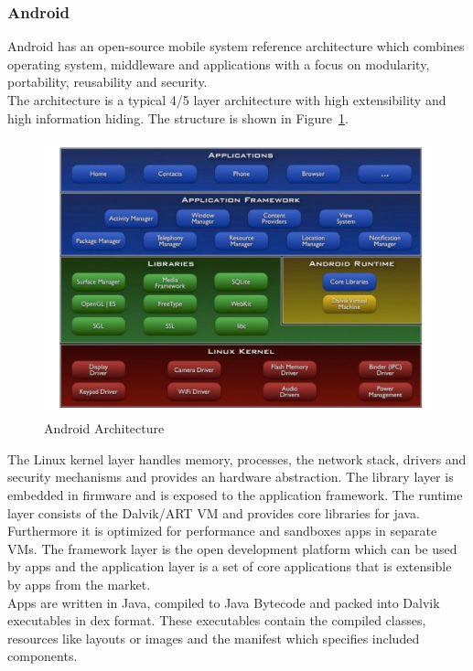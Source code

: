 \subsubsection{Android}
Android has an open-source mobile system reference architecture which combines operating system, middleware and applications with a focus on modularity, portability, reusability and security.\\
The architecture is a typical 4/5 layer architecture with high extensibility and high information hiding.
The structure is shown in Figure~\ref{fig:android}.
\begin{figure}[h]
  \centering
  \includegraphics[width=.8\textwidth]{images/android.png}
  \caption{Android Architecture}\label{fig:android}
\end{figure}
The Linux kernel layer handles memory, processes, the network stack, drivers and security mechanisms and provides an hardware abstraction.
The library layer is embedded in firmware and is exposed to the application framework.
The runtime layer consists of the Dalvik/ART VM and provides core libraries for java.
Furthermore it is optimized for performance and sandboxes apps in separate VMs.
The framework layer is the open development platform which can be used by apps and the application layer is a set of core applications that is extensible by apps from the market.\\

Apps are written in Java, compiled to Java Bytecode and packed into Dalvik executables in dex format.
These executables contain the compiled classes, resources like layouts or images and the manifest which specifies included components.

